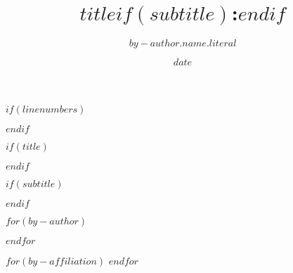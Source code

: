 
\usepackage{etoolbox}


$if(linenumbers)$
  \usepackage[left, displaymath, mathlines]{lineno}
  \linenumbers
$endif$


\providecommand{\keywords}[1]{\noindent\textbf{Keywords: }#1}

\providecommand{\targets}[1]{\noindent\textbf{Target Journal(s): }#1}

\providecommand{\correspond}[1]{
  \noindent Corresponding author email: \textit{#1}
}

\usepackage{authblk}
\renewcommand*{\Authsep}{, }
\renewcommand*{\Authand}{ and }
\renewcommand*{\Authands}{, and }
\renewcommand\Affilfont{\small\itshape}
\renewcommand\Authfont{\fontsize{12}{14.4}\selectfont}

\makeatletter
\renewcommand{\maketitle}{
  \setlength{\parindent}{0pt}
  \bgroup
  \begin{flushleft}
    \textbf{\Large{\@title}}
    \vskip 10pt
    \@author
    \vskip 10pt
    \textit{\small Draft compiled on \@date}
  \end{flushleft}
  \egroup
}
\makeatother

\setlength{\affilsep}{10pt}

$if(title)$
  \title{$title$$if(subtitle)$:$endif$}
$endif$

$if(subtitle)$
  \makeatletter
  \providecommand{\subtitle}[1]{%
    \apptocmd{\@title}{ #1 \par}{}{}
  }
  \makeatother
  \subtitle{$subtitle$}
$endif$

$for(by-author)$
\author[$for(it.affiliations)$$it.number$$sep$,$endfor$]{$by-author.name.literal$}
$endfor$

$for(by-affiliation)$
$endfor$

\date{$date$}

